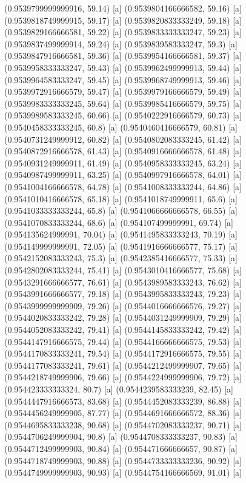{{{(0.9539799999999916, 59.14) [a] 
(0.9539804166666582, 59.16) [a] 
(0.9539818749999915, 59.17) [a] 
(0.9539820833333249, 59.18) [a] 
(0.9539829166666581, 59.22) [a] 
(0.9539833333333247, 59.23) [a] 
(0.9539837499999914, 59.24) [a] 
(0.9539839583333247, 59.3) [a] 
(0.9539847916666581, 59.36) [a] 
(0.9539954166666581, 59.37) [a] 
(0.9539958333333247, 59.43) [a] 
(0.9539962499999913, 59.44) [a] 
(0.9539964583333247, 59.45) [a] 
(0.9539968749999913, 59.46) [a] 
(0.9539972916666579, 59.47) [a] 
(0.9539979166666579, 59.49) [a] 
(0.9539983333333245, 59.64) [a] 
(0.9539985416666579, 59.75) [a] 
(0.9539989583333245, 60.66) [a] 
(0.9540222916666579, 60.73) [a] 
(0.9540458333333245, 60.8) [a] 
(0.9540460416666579, 60.81) [a] 
(0.9540731249999912, 60.82) [a] 
(0.9540802083333245, 61.42) [a] 
(0.9540872916666578, 61.43) [a] 
(0.9540916666666578, 61.48) [a] 
(0.9540931249999911, 61.49) [a] 
(0.9540958333333245, 63.24) [a] 
(0.9540987499999911, 63.25) [a] 
(0.9540997916666578, 64.01) [a] 
(0.9541004166666578, 64.78) [a] 
(0.9541008333333244, 64.86) [a] 
(0.9541010416666578, 65.18) [a] 
(0.9541018749999911, 65.6) [a] 
(0.9541033333333244, 65.8) [a] 
(0.9541066666666578, 66.55) [a] 
(0.9541070833333244, 68.6) [a] 
(0.954107499999991, 69.74) [a] 
(0.954135624999991, 70.04) [a] 
(0.9541495833333243, 70.19) [a] 
(0.954149999999991, 72.05) [a] 
(0.9541916666666577, 75.17) [a] 
(0.9542152083333243, 75.3) [a] 
(0.9542385416666577, 75.33) [a] 
(0.9542802083333244, 75.41) [a] 
(0.9543010416666577, 75.68) [a] 
(0.9543291666666577, 76.61) [a] 
(0.9543989583333243, 76.62) [a] 
(0.9543991666666577, 79.18) [a] 
(0.9543995833333243, 79.23) [a] 
(0.9543999999999909, 79.26) [a] 
(0.9544016666666576, 79.27) [a] 
(0.9544020833333242, 79.28) [a] 
(0.9544031249999909, 79.29) [a] 
(0.9544052083333242, 79.41) [a] 
(0.9544145833333242, 79.42) [a] 
(0.9544147916666575, 79.44) [a] 
(0.9544166666666575, 79.53) [a] 
(0.9544170833333241, 79.54) [a] 
(0.9544172916666575, 79.55) [a] 
(0.9544177083333241, 79.61) [a] 
(0.9544212499999907, 79.65) [a] 
(0.9544218749999906, 79.66) [a] 
(0.9544224999999906, 79.72) [a] 
(0.954423333333324, 80.7) [a] 
(0.9544239583333239, 82.45) [a] 
(0.9544447916666573, 83.68) [a] 
(0.9544452083333239, 86.88) [a] 
(0.9544456249999905, 87.77) [a] 
(0.9544691666666572, 88.36) [a] 
(0.9544695833333238, 90.68) [a] 
(0.9544702083333237, 90.71) [a] 
(0.9544706249999904, 90.8) [a] 
(0.9544708333333237, 90.83) [a] 
(0.9544712499999903, 90.84) [a] 
(0.954471666666657, 90.87) [a] 
(0.9544718749999903, 90.88) [a] 
(0.9544733333333236, 90.92) [a] 
(0.9544749999999903, 90.93) [a] 
(0.9544754166666569, 91.01) [a] 
}}}
